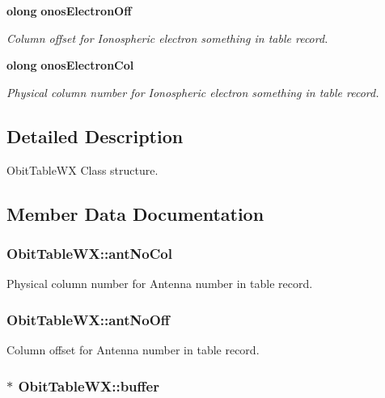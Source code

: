 \begin{CompactItemize}
{\bf olong} {\bf onos\-Electron\-Off}
\begin{CompactList}\small\item\em Column offset for Ionospheric electron something in table record. \item\end{CompactList}\item 
{\bf olong} {\bf onos\-Electron\-Col}
\begin{CompactList}\small\item\em Physical column number for Ionospheric electron something in table record. \item\end{CompactList}\end{CompactItemize}


\subsection{Detailed Description}
Obit\-Table\-WX Class structure. 



\subsection{Member Data Documentation}
\subsubsection{ {\bf Obit\-Table\-WX::ant\-No\-Col}}\label{structObitTableWX_o23}


Physical column number for Antenna number in table record. 

\subsubsection{ {\bf Obit\-Table\-WX::ant\-No\-Off}}\label{structObitTableWX_o22}


Column offset for Antenna number in table record. 

\subsubsection{$\ast$ {\bf Obit\-Table\-WX::buffer}}\label{structObitTableWX_o10}


